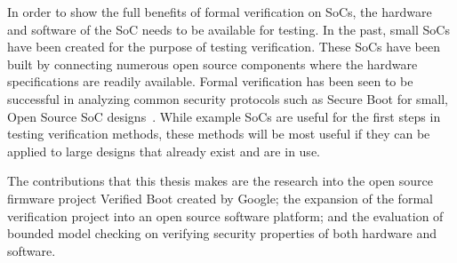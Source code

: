 \documentclass[../report.tex]{subfiles}
\begin{document}
In order to show the full benefits of formal verification on SoCs, the hardware
and software of the SoC needs to be available for testing.
In the past, small SoCs have been created for the purpose of testing verification.
These SoCs have been built by connecting numerous open source components where the hardware specifications are readily available.
Formal verification has been seen to be successful in analyzing common security protocols such as Secure Boot for small, Open Source SoC designs~\cite{elane}. 
While example SoCs are useful for the first steps in testing verification methods, these methods will be most useful if they can be applied to large designs that already exist and are in use.

The contributions that this thesis makes are the research into the open source firmware project Verified Boot created by Google; the expansion of the formal verification project into an open source software platform; and the evaluation of bounded model checking on verifying security properties of both hardware and software.

\end{document}
